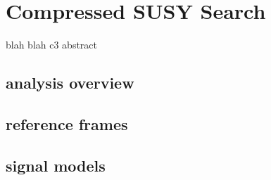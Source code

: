 
\setcounter{secnumdepth}{3}
\setcounter{tocdepth}{3}
\setlength{\parskip}{\smallskipamount}
\setlength{\parindent}{0pt}


\makeatletter


\providecommand{\tabularnewline}{\\}


\makeatother

%

\chapter{Compressed SUSY Search}

\begin{chapterabstract}
blah blah c3 abstract
\end{chapterabstract}

\section{analysis overview}


\section{ reference frames}

\section{ signal models}
